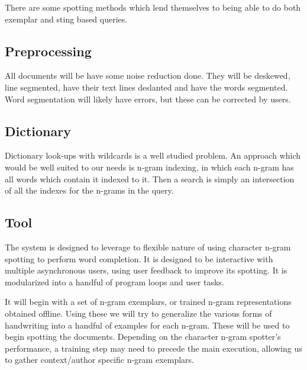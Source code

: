 \documentclass[ms]{byuprop}
\begin{document}
There are some spotting methods which lend themselves to being able to do both exemplar and sting based queries\cite{Almazan2014}.

\subsection{Preprocessing}
All documents will be have some noise reduction done. They will be deskewed, line segmented, have their text lines deslanted and have the words segmented. Word segmentation will likely have errors, but these can be corrected by users.

\subsection{Dictionary}
Dictionary look-ups with wildcards is a well studied problem. An approach which would be well suited to our needs is n-gram indexing, in which each n-gram has all words which contain it indexed to it. Then a search is simply an intersection of all the indexes for the n-grams in the query.

\subsection{Tool}
The system is designed to leverage to flexible nature of using character n-gram spotting to perform word completion. It is designed to be interactive with multiple asynchronous users, using user feedback to improve its spotting. It is modularized into a handful of program loops and user tasks.

It will begin with a set of n-gram exemplars, or trained n-gram representations obtained offline. Using these we will try to generalize the various forms of handwriting into a handful of examples for each n-gram. These will be used to begin spotting the documents. Depending on the character n-gram spotter's performance, a training step may need to precede the main execution, allowing us to gather context/author specific n-gram exemplars. 
\end{document}
